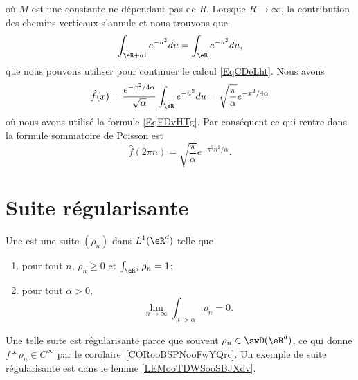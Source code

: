 \begin{example}
	où \( M\) est une constante ne dépendant pas de \( R\). Lorsque \( R\to \infty\), la contribution des chemins verticaux s'annule et nous trouvons que
	\begin{equation}    \label{EqjrNxLr}
		\int_{\eR+ai} e^{-u^2}du=\int_{\eR} e^{-u^2}du,
	\end{equation}
	que nous pouvons utiliser pour continuer le calcul \eqref{EqCDeLht}. Nous avons
	\begin{equation}
		\hat f(x)= \frac{ e^{-x^2/4\alpha}}{\sqrt{\alpha}}\int_{\eR} e^{-u^2}du\\
		=\sqrt{\frac{ \pi }{ \alpha }} e^{-x^2/4\alpha}
	\end{equation}
	où nous avons utilisé la formule \eqref{EqFDvHTg}. Par conséquent ce qui rentre dans la formule sommatoire de Poisson est
	\begin{equation}
		\hat f(2\pi n)=\sqrt{\frac{ \pi }{ \alpha }} e^{-\pi^2 n^2/\alpha}.
	\end{equation}
\end{example}

\section{Suite régularisante}

\begin{definition}      \label{DEFooRIFYooUUUoha}
	Une  est une suite \( (\rho_n)\) dans \( L^1(\eR^d)\) telle que
	\begin{enumerate}
		\item       \label{ITEMooEYXYooAkKeXX}
		      pour tout \( n\), \( \rho_n\geq 0\) et \( \int_{\eR^d}\rho_n=1\);
		\item
		      pour tout \( \alpha>0\),
		      \begin{equation}
			      \lim_{n\to \infty} \int_{| t |>\alpha}\rho_n=0.
		      \end{equation}
	\end{enumerate}
\end{definition}
Une telle suite est régularisante parce que souvent \( \rho_n\in\swD(\eR^d)\), ce qui donne \( f*\rho_n\in C^{\infty}\) par le corolaire~\ref{CORooBSPNooFwYQrc}. Un exemple de suite régularisante est dans le lemme \ref{LEMooTDWSooSBJXdv}.

